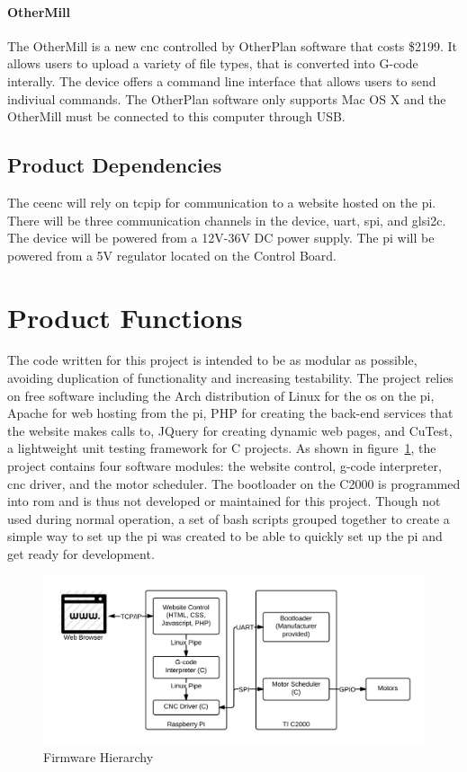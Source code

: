 \paragraph{OtherMill}
The OtherMill is a new \gls{cnc} controlled by OtherPlan software that costs \$2199.
It allows users to upload a variety of file types, that is converted into G-code interally.
The device offers a command line interface that allows users to send indiviual commands.
The OtherPlan software only supports Mac OS X and the OtherMill must be connected to this computer through USB.

\subsection{Product Dependencies}
The \gls{ceenc} will rely on \gls{tcpip} for communication to a website hosted on the \gls{pi}.
There will be three communication channels in the device, \gls{uart}, \gls{spi}, and gls{i2c}.
The device will be powered from a 12V-36V DC power supply.
The \gls{pi} will be powered from a 5V regulator located on the Control Board.

\section{Product Functions}
The code written for this project is intended to be as modular as possible, avoiding duplication of functionality and increasing testability.
The project relies on free software including the Arch distribution of Linux\cite{archlinux} for the \gls{os} on the \gls{pi}, Apache for web hosting from the \gls{pi}, PHP for creating the back-end services that the website makes calls to, JQuery for creating dynamic web pages, and CuTest, a lightweight unit testing framework for C projects.
As shown in figure~\ref{fig:firmware-hierarchy}, the project contains four software modules: the website control, g-code interpreter, \gls{cnc} driver, and the motor scheduler.
The bootloader on the C2000 is programmed into \gls{rom} and is thus not developed or maintained for this project.
Though not used during normal operation, a set of bash scripts grouped together to create a simple way to set up the \gls{pi} was created to be able to quickly set up the \gls{pi} and get ready for development.

\begin{figure}[!ht]
	\centering
	\includegraphics[width=1\textwidth]{firmware-hierarchy.png}
	\caption{Firmware Hierarchy}
	\label{fig:firmware-hierarchy}
\end{figure}

